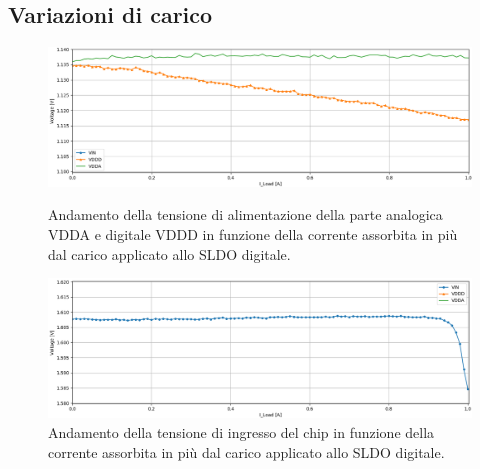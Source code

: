 \subsection{Variazioni di carico}

\begin{figure}
\centering
\includegraphics[width=\textwidth]{Immagini/LoadVDDD}
\caption{Andamento della tensione di alimentazione della parte analogica VDDA e digitale VDDD in funzione della corrente assorbita in più dal carico applicato allo SLDO digitale.}
\label{LoadVDDD}
\includegraphics[width=\textwidth]{Immagini/LoadVIND}
\caption{Andamento della tensione di ingresso del chip in funzione della corrente assorbita in più dal carico applicato allo SLDO digitale.}
\label{LoadVIND}
\end{figure}

